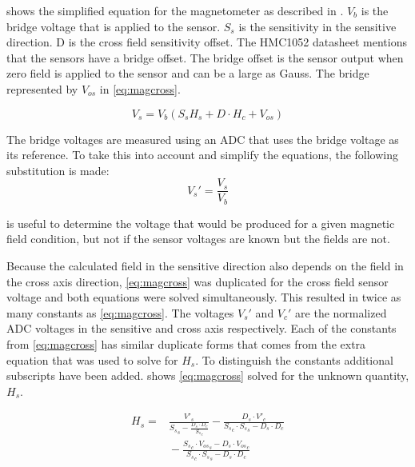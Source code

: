  shows the simplified equation for the magnetometer as described in \cite{AN215}. $V_b$ is the bridge voltage that is applied to the sensor. $S_s$ is the sensitivity in the sensitive direction. D is the cross field sensitivity offset. The HMC1052 datasheet\cite{HMC1052} mentions that the sensors have a bridge offset. The bridge offset is the sensor output when zero field is applied to the sensor and can be a large as  Gauss. The bridge represented by $V_{os}$ in \cref{eq:magcross}.

\begin{equation}
    V_s = V_b \left(S_s H_s + D \cdot H_c + V_{os} \right)
    \label{eq:magcross}
\end{equation}
 
The bridge voltages are measured using an \ac{ADC} that uses the bridge voltage as its reference. To take this into account and simplify the equations, the following substitution is made:
\begin{equation}
    V_s'=\frac{V_s}{V_b}
    \label{eq:adcsub}
\end{equation}

 is useful to determine the voltage that would be produced for a given magnetic field condition, but not if the sensor voltages are known but the fields are not.

Because the calculated field in the sensitive direction also depends on the field in the cross axis direction, \cref{eq:magcross} was duplicated for the cross field sensor voltage and both equations were solved simultaneously. This resulted in twice as many constants as \cref{eq:magcross}. The voltages $V_s'$ and $V_c'$ are the normalized \ac{ADC} voltages in the sensitive and cross axis respectively. Each of the constants from \cref{eq:magcross} has similar duplicate forms that comes from the extra equation that was used to solve for $H_s$. To distinguish the constants additional subscripts have been added.  shows \cref{eq:magcross} solved for the unknown quantity, $H_s$.

\begin{equation}
    \begin{split}
    H_s = & \frac{V'_s }{{S_s}_s - \frac{D_s \cdot D_c}{{S_s}_c}} - \frac{D_s \cdot  V'_c }{{S_s}_c \cdot {S_s}_s - D_s \cdot D_c}\\
    & {}- \frac{{S_s}_c \cdot {V_{os}}_s  -D_s \cdot {V_{os}}_c}{{S_s}_c \cdot {S_s}_s - D_s \cdot D_c}
    \end{split}
    \label{eq:magsolved} 
\end{equation}

